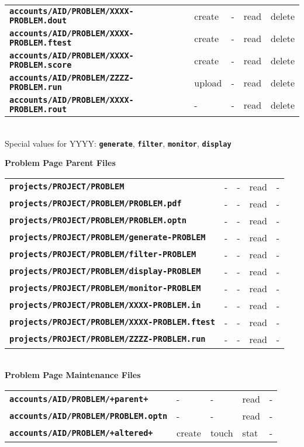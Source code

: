 \documentclass[12pt]{article}
\newcommand{\TT}[1]{{\tt \bfseries #1}}
\begin{document}
\begin{center}
\begin{tabular}{lllll}
\TT{accounts/AID/PROBLEM/XXXX-PROBLEM.dout} & create  & -  & read & delete \\
\TT{accounts/AID/PROBLEM/XXXX-PROBLEM.ftest} & create  & - & read & delete \\
\TT{accounts/AID/PROBLEM/XXXX-PROBLEM.score} & create  & - & read & delete
\\[1ex]
\TT{accounts/AID/PROBLEM/ZZZZ-PROBLEM.run}  & upload  & - & read & delete \\
\TT{accounts/AID/PROBLEM/XXXX-PROBLEM.rout} & -  & -  & read & delete \\
\end{tabular}
\\[1ex]
Special values for YYYY: \TT{generate}, \TT{filter}, \TT{monitor}, \TT{display}

\newpage

{\bf Problem Page Parent Files}
\\[1ex]
\begin{tabular}{lllll}
\TT{projects/PROJECT/PROBLEM}	        	& -  & - & read & - \\
\TT{projects/PROJECT/PROBLEM/PROBLEM.pdf}    	& -  & - & read & - \\
\TT{projects/PROJECT/PROBLEM/PROBLEM.optn}    	& -  & - & read & - \\
\TT{projects/PROJECT/PROBLEM/generate-PROBLEM} 	& -  & - & read & - \\
\TT{projects/PROJECT/PROBLEM/filter-PROBLEM} 	& -  & - & read & - \\
\TT{projects/PROJECT/PROBLEM/display-PROBLEM} 	& -  & - & read & - \\
\TT{projects/PROJECT/PROBLEM/monitor-PROBLEM} 	& -  & - & read & - \\
\TT{projects/PROJECT/PROBLEM/XXXX-PROBLEM.in}	& -  & - & read & - \\
\TT{projects/PROJECT/PROBLEM/XXXX-PROBLEM.ftest} & -  & - & read & - \\
\TT{projects/PROJECT/PROBLEM/ZZZZ-PROBLEM.run} & -  & - & read & -
\\[1ex]
\end{tabular}
\\\bigskip
{\bf Problem Page Maintenance Files}
\\[1ex]
\begin{tabular}{lllll}
\TT{accounts/AID/PROBLEM/+parent+}	& -  & - & read & - \\
\TT{accounts/AID/PROBLEM/PROBLEM.optn}	& -  & - & read & - \\
\TT{accounts/AID/PROBLEM/+altered+}	& create  & touch & stat & -

\end{tabular}
\end{center}
\end{document}
